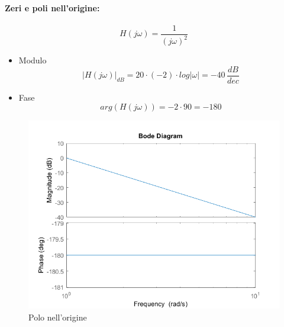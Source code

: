 \documentclass[a4paper,oneside,titlepage]{book}
\begin{document}
\paragraph{Zeri e poli nell'origine:}
\[ H(j\omega)=\frac{1}{(j\omega)^2} \]
\begin{itemize}
	\item Modulo
	\[ |H(j\omega)|_{dB} = 20 \cdot (-2) \cdot log|\omega| = -40 \, \frac{dB}{dec}  \]
	\item Fase
	\[ arg(H(j\omega)) = -2 \cdot 90 = -180 \]
\end{itemize}
\begin{figure}[htp]
	\centering
	\includegraphics[scale=0.5]{origine.png}
	\caption{Polo nell'origine}
	\label{fig:origine}
\end{figure}
\end{document}
